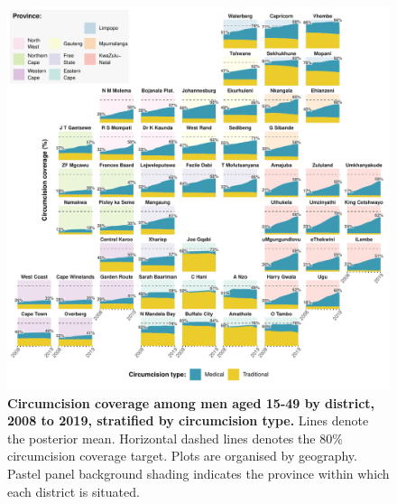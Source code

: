 \documentclass{article}
\begin{document}
\begin{figure}[H]
  \centering
  \includegraphics[width = \linewidth]{Figures/paper/Figure4.pdf}
  \caption{{\bf Circumcision coverage among men aged 15-49 by district, 2008 to 2019, stratified by circumcision type.} Lines denote the posterior mean. Horizontal dashed lines denotes the 80\% circumcision coverage target. Plots are organised by geography. Pastel panel background shading indicates the province within which each district is situated.}
  \label{fig::district1549prev}
\end{figure}

\end{document}
